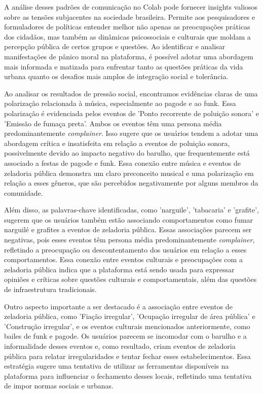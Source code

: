 A análise desses padrões de comunicação no Colab pode fornecer insights valiosos sobre as tensões subjacentes na sociedade brasileira. Permite aos pesquisadores e formuladores de políticas entender melhor não apenas as preocupações práticas dos cidadãos, mas também as dinâmicas psicossociais e culturais que moldam a percepção pública de certos grupos e questões. Ao identificar e analisar manifestações de pânico moral na plataforma, é possível adotar uma abordagem mais informada e matizada para enfrentar tanto as questões práticas da vida urbana quanto os desafios mais amplos de integração social e tolerância.

Ao analisar os resultados de pressão social, encontramos evidências claras de uma polarização relacionada à música, especialmente ao pagode e ao funk. Essa polarização é evidenciada pelos eventos de 'Ponto recorrente de poluição sonora' e 'Emissão de fumaça preta'. Ambos os eventos têm uma persona média predominantemente \textit{complainer}. Isso sugere que os usuários tendem a adotar uma abordagem crítica e insatisfeita em relação a eventos de poluição sonora, possivelmente devido ao impacto negativo do barulho, que frequentemente está associado a festas de pagode e funk. Essa conexão entre música e eventos de zeladoria pública demonstra um claro preconceito musical e uma polarização em relação a esses gêneros, que são percebidos negativamente por alguns membros da comunidade.

Além disso, as palavras-chave identificadas, como 'narguile', 'tabacaria' e 'grafite', sugerem que os usuários também estão associando comportamentos como fumar narguilé e grafites a eventos de zeladoria pública. Essas associações parecem ser negativas, pois esses eventos têm persona média predominantemente \textit{complainer}, refletindo a preocupação ou descontentamento dos usuários em relação a esses comportamentos. Essa conexão entre eventos culturais e preocupações com a zeladoria pública indica que a plataforma está sendo usada para expressar opiniões e críticas sobre questões culturais e comportamentais, além das questões de infraestrutura tradicionais.

Outro aspecto importante a ser destacado é a associação entre eventos de zeladoria pública, como 'Fiação irregular', 'Ocupação irregular de área pública' e 'Construção irregular', e os eventos culturais mencionados anteriormente, como bailes de funk e pagode. Os usuários parecem se incomodar com o barulho e a informalidade desses eventos e, como resultado, criam eventos de zeladoria pública para relatar irregularidades e tentar fechar esses estabelecimentos. Essa estratégia sugere uma tentativa de utilizar as ferramentas disponíveis na plataforma para influenciar o fechamento desses locais, refletindo uma tentativa de impor normas sociais e urbanas.

